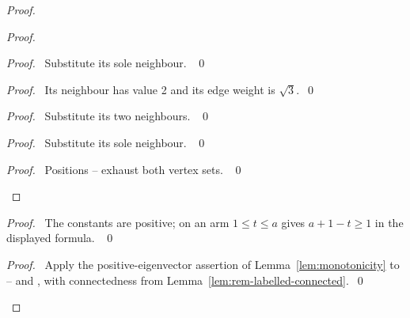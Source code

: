 \begin{proof}
\begin{proof}
\begin{proof}\pf\ Substitute its sole neighbour. ~\qed\end{proof}
\begin{proof}\pf\ Its neighbour has value 2 and its edge weight is $\sqrt3$.~\qed\end{proof}
\begin{proof}\pf\ Substitute its two neighbours. ~\qed\end{proof}
\begin{proof}\pf\ Substitute its sole neighbour. ~\qed\end{proof}
\qedstep
\begin{proof}\pf\ Positions --
exhaust both vertex sets. ~\qed\end{proof}
\end{proof}
\begin{proof}\pf\ The constants are positive; on an arm $1\leq t\leq a$
gives $a+1-t\geq1$ in the displayed formula. ~\qed\end{proof}
\qedstep
\begin{proof}\pf\ Apply the positive-eigenvector assertion of
Lemma~\ref{lem:monotonicity} to --
and , with connectedness from
Lemma~\ref{lem:rem-labelled-connected}.~\qed\end{proof}
\end{proof}


